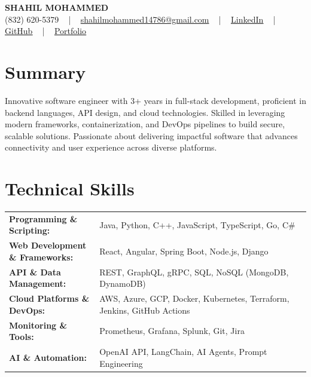 \documentclass[letterpaper,11pt]{article}
\begin{document}
\begin{center}
    {\fontsize{14pt}{12pt}\selectfont \textbf{\MakeUppercase{Shahil Mohammed}}}\\ \vspace{2pt}
    \fontsize{10pt}{12pt}\selectfont (832) 620-5379 ~ | ~ \href{mailto:shahilmohammed14786@gmail.com}{shahilmohammed14786@gmail.com} ~ | ~  
    \href{https://www.linkedin.com/in/shahil-mohammed-9652931a1/}{\color{blue}\underline{LinkedIn}}  ~ | ~ 
    \href{https://github.com/freakbeast14}{\color{blue}\underline{GitHub}} ~ | ~ 
    \href{https://shahil-mohammed.netlify.app/}{\color{blue}\underline{Portfolio}}
    \vspace{-8pt}
\end{center}

\section{Summary}
\fontsize{9pt}{10pt}\selectfont
Innovative software engineer with 3+ years in full-stack development, proficient in backend languages, API design, and cloud technologies. Skilled in leveraging modern frameworks, containerization, and DevOps pipelines to build secure, scalable solutions. Passionate about delivering impactful software that advances connectivity and user experience across diverse platforms.
 \vspace{-5pt}
 
\section{Technical Skills}
        \vspace{-14pt}
        \begin{table}[h]
            \fontsize{9pt}{10pt}\selectfont
            \begin{tabular}{p{0.3\linewidth} p{0.7\linewidth}}
                \textbf{Programming \& Scripting:} & Java, Python, C++, JavaScript, TypeScript, Go, C\# \\
                \textbf{Web Development \& Frameworks:} & React, Angular, Spring Boot, Node.js, Django \\
                \textbf{API \& Data Management:} & REST, GraphQL, gRPC, SQL, NoSQL (MongoDB, DynamoDB) \\
                \textbf{Cloud Platforms \& DevOps:} & AWS, Azure, GCP, Docker, Kubernetes, Terraform, Jenkins, GitHub Actions \\
                \textbf{Monitoring \& Tools:} & Prometheus, Grafana, Splunk, Git, Jira \\
                \textbf{AI \& Automation:} & OpenAI API, LangChain, AI Agents, Prompt Engineering \\
            \end{tabular}
        \end{table}
 \vspace{-15pt}
 
\end{document}
